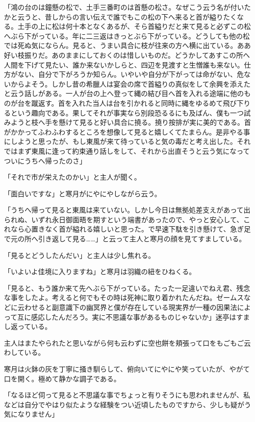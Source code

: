 \documentclass[12pt, openright]{book}
\begin{document}
「鴻の台のは鐘懸の松で、土手三番町のは首懸の松さ。なぜこう云う名が付いたかと云うと、昔しからの言い伝えで誰でもこの松の下へ来ると首が縊りたくなる。土手の上に松は何十本となくあるが、そら首縊りだと来て見ると必ずこの松へぶら下がっている。年に二三返はきっとぶら下がっている。どうしても他の松では死ぬ気にならん。見ると、うまい具合に枝が往来の方へ横に出ている。ああ好い枝振りだ。あのままにしておくのは惜しいものだ。どうかしてあすこの所へ人間を下げて見たい、誰か来ないかしらと、四辺を見渡すと生憎誰も来ない。仕方がない、自分で下がろうか知らん。いやいや自分が下がっては命がない、危ないからよそう。しかし昔の希臘人は宴会の席で首縊りの真似をして余興を添えたと云う話しがある。一人が台の上へ登って縄の結び目へ首を入れる途端に他のものが台を蹴返す。首を入れた当人は台を引かれると同時に縄をゆるめて飛び下りるという趣向である。果してそれが事実なら別段恐るるにも及ばん、僕も一つ試みようと枝へ手を懸けて見ると好い具合に撓る。撓り按排が実に美的である。首がかかってふわふわするところを想像して見ると嬉しくてたまらん。是非やる事にしようと思ったが、もし東風が来て待っていると気の毒だと考え出した。それではまず東風に逢って約束通り話しをして、それから出直そうと云う気になってついにうちへ帰ったのさ」

「それで市が栄えたのかい」と主人が聞く。

「面白いですな」と寒月がにやにやしながら云う。

「うちへ帰って見ると東風は来ていない。しかし今日は無拠処差支えがあって出られぬ、いずれ永日御面晤を期すという端書があったので、やっと安心して、これなら心置きなく首が縊れる嬉しいと思った。で早速下駄を引き懸けて、急ぎ足で元の所へ引き返して見る\ldots{}\ldots{}」と云って主人と寒月の顔を見てすましている。

「見るとどうしたんだい」と主人は少し焦れる。

「いよいよ佳境に入りますね」と寒月は羽織の紐をひねくる。

「見ると、もう誰か来て先へぶら下がっている。たった一足違いでねえ君、残念な事をしたよ。考えると何でもその時は死神に取り着かれたんだね。ゼームスなどに云わせると副意識下の幽冥界と僕が存在している現実界が一種の因果法によって互に感応したんだろう。実に不思議な事があるものじゃないか」迷亭はすまし返っている。

主人はまたやられたと思いながら何も云わずに空也餅を頬張って口をもごもご云わしている。

寒月は火鉢の灰を丁寧に掻き馴らして、俯向いてにやにや笑っていたが、やがて口を開く。極めて静かな調子である。

「なるほど伺って見ると不思議な事でちょっと有りそうにも思われませんが、私などは自分でやはり似たような経験をつい近頃したものですから、少しも疑がう気になりません」
\end{document}
